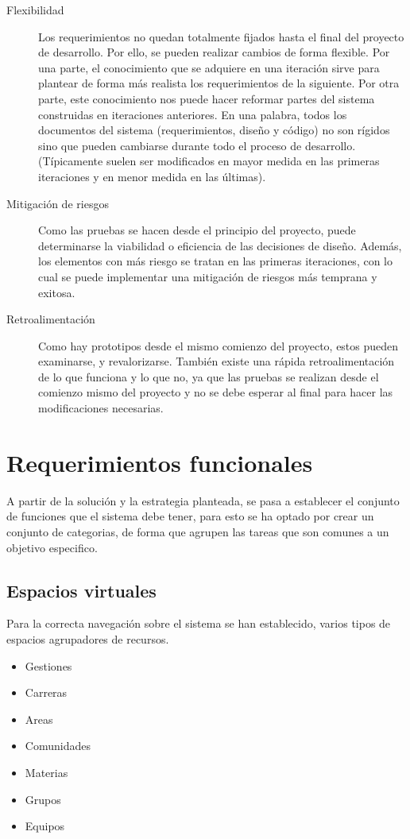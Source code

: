 \begin{description}
\item [Flexibilidad] Los requerimientos no quedan totalmente fijados hasta el
final del proyecto de desarrollo. Por ello, se pueden realizar cambios de forma
flexible. Por una parte, el conocimiento que se adquiere en una iteración sirve
para plantear de forma más realista los requerimientos de la siguiente. Por
otra parte, este conocimiento nos puede hacer reformar partes del sistema
construidas en iteraciones anteriores. En una palabra, todos los documentos del
sistema (requerimientos, diseño y código) no son rígidos sino que pueden
cambiarse durante todo el proceso de desarrollo. (Típicamente suelen ser
modificados en mayor medida en las primeras iteraciones y en menor medida en
las últimas).
\item [Mitigación de riesgos] Como las pruebas se hacen desde el principio del
proyecto, puede determinarse la viabilidad o eficiencia de las decisiones de
diseño. Además, los elementos con más riesgo se tratan en las primeras
iteraciones, con lo cual se puede implementar una mitigación de riesgos más 
temprana y exitosa.
\item [Retroalimentación] Como hay prototipos desde el mismo comienzo del
proyecto, estos pueden examinarse, y revalorizarse. También existe una rápida
retroalimentación de lo que funciona y lo que no, ya que las pruebas se 
realizan desde el comienzo mismo del proyecto y no se debe esperar al final
para hacer las modificaciones necesarias.
\end{description}

\section{Requerimientos funcionales}

A partir de la solución y la estrategia planteada, se pasa a establecer el
conjunto de funciones que el sistema debe tener, para esto se ha optado por
crear un conjunto de categorias, de forma que agrupen las tareas que son comunes
a un objetivo especifico.

\subsection{Espacios virtuales}

Para la correcta navegación sobre el sistema se han establecido, varios tipos de
espacios agrupadores de recursos.

\begin{itemize}
\item Gestiones
\item Carreras
\item Areas
\item Comunidades
\item Materias
\item Grupos
\item Equipos
\end{itemize}

